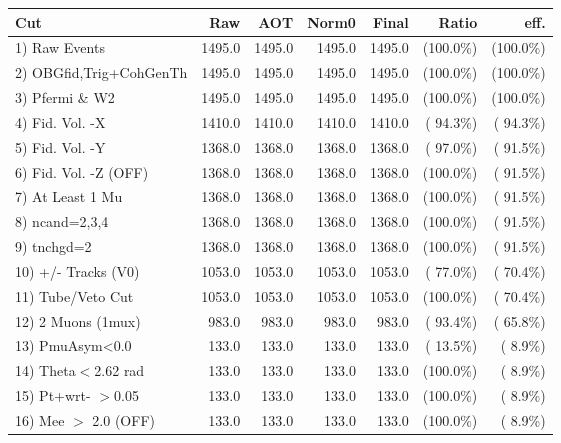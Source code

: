  \begin{table}[h!]\centering
 \begin{tabular}{||l||r|r|r|r|r|r||}
 \hline
 \hline
 Cut & Raw & AOT & Norm0 & Final & Ratio & eff.       \\
 \hline
  1) Raw Events           &       1495.0 &       1495.0 &       1495.0 &       1495.0 & (100.0\%) & (100.0\%) \\
  2) OBGfid,Trig+CohGenTh &       1495.0 &       1495.0 &       1495.0 &       1495.0 & (100.0\%) & (100.0\%) \\
  3) Pfermi \& W2         &       1495.0 &       1495.0 &       1495.0 &       1495.0 & (100.0\%) & (100.0\%) \\
  4) Fid. Vol. -X         &       1410.0 &       1410.0 &       1410.0 &       1410.0 & ( 94.3\%) & ( 94.3\%) \\
  5) Fid. Vol. -Y         &       1368.0 &       1368.0 &       1368.0 &       1368.0 & ( 97.0\%) & ( 91.5\%) \\
  6) Fid. Vol. -Z (OFF)   &       1368.0 &       1368.0 &       1368.0 &       1368.0 & (100.0\%) & ( 91.5\%) \\
  7) At Least 1 Mu        &       1368.0 &       1368.0 &       1368.0 &       1368.0 & (100.0\%) & ( 91.5\%) \\
  8) ncand=2,3,4          &       1368.0 &       1368.0 &       1368.0 &       1368.0 & (100.0\%) & ( 91.5\%) \\
  9) tnchgd=2             &       1368.0 &       1368.0 &       1368.0 &       1368.0 & (100.0\%) & ( 91.5\%) \\
 10) +/- Tracks (V0)      &       1053.0 &       1053.0 &       1053.0 &       1053.0 & ( 77.0\%) & ( 70.4\%) \\
 11) Tube/Veto Cut        &       1053.0 &       1053.0 &       1053.0 &       1053.0 & (100.0\%) & ( 70.4\%) \\
 12) 2 Muons (1mux)       &        983.0 &        983.0 &        983.0 &        983.0 & ( 93.4\%) & ( 65.8\%) \\
 13) PmuAsym<0.0          &        133.0 &        133.0 &        133.0 &        133.0 & ( 13.5\%) & (  8.9\%) \\
 14) Theta$<$2.62 rad     &        133.0 &        133.0 &        133.0 &        133.0 & (100.0\%) & (  8.9\%) \\
 15) Pt+wrt- $>$0.05      &        133.0 &        133.0 &        133.0 &        133.0 & (100.0\%) & (  8.9\%) \\
 16) Mee $>$ 2.0  (OFF)   &        133.0 &        133.0 &        133.0 &        133.0 & (100.0\%) & (  8.9\%) \\

\end{tabular}
\end{table}
